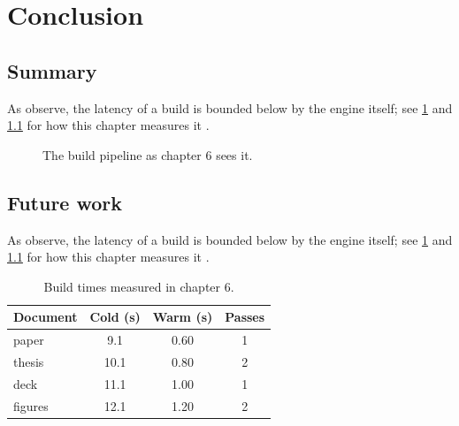 \chapter{Conclusion}\label{ch:conclusion}

\section{Summary}\label{sec:conclusion-0}
\lipsum[9-30]

As \textcite{kleppmann2019} observe, the latency \latency{} of a build is
bounded below by the engine itself; see \cref{ch:conclusion} and \cref{fig:conclusion}
for how this chapter measures it \parencite{lamport1994}.

\begin{figure}[t]
  \centering
  \caption{The build pipeline as chapter 6 sees it.}\label{fig:conclusion}
\end{figure}

\section{Future work}\label{sec:conclusion-1}
\lipsum[31-52]

As \textcite{lamport1994} observe, the latency \latency{} of a build is
bounded below by the engine itself; see \cref{ch:conclusion} and \cref{fig:conclusion}
for how this chapter measures it \parencite{knuth1984}.

\begin{table}[t]
  \centering
  \begin{tabular}{lSSS}
    \toprule
    Document & {Cold (s)} & {Warm (s)} & {Passes} \\
    \midrule
    paper & 9.1 & 0.60 & 1 \\
    thesis & 10.1 & 0.80 & 2 \\
    deck & 11.1 & 1.00 & 1 \\
    figures & 12.1 & 1.20 & 2 \\
    \bottomrule
  \end{tabular}
  \caption{Build times measured in chapter 6.}\label{tab:conclusion}
\end{table}

